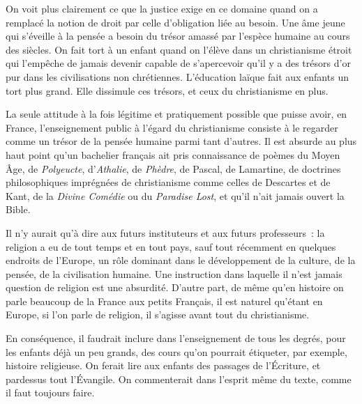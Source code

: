 \documentclass[french,twoside]{book} %
\begin{document}
On voit plus clairement ce que la justice exige en ce domaine quand on a remplacé la notion de droit par celle d'obligation liée au besoin. Une âme jeune qui s'éveille à la pensée a besoin du trésor amassé par l'espèce humaine au cours des siècles. On fait tort à un enfant quand on l'élève dans un christianisme étroit qui l'empêche de jamais devenir capable de s'apercevoir qu'il y a des trésors d'or pur dans les civilisations non chrétiennes. L'éducation laïque fait aux enfants un tort plus grand. Elle dissimule ces trésors, et ceux du christianisme en plus.\par
La seule attitude à la fois légitime et pratiquement possible que puisse avoir, en France, l'enseignement public à l'égard du christianisme consiste à le regarder comme un trésor de la pensée humaine parmi tant d'autres. Il est absurde au plus haut point qu'un bachelier français ait pris connaissance de poèmes du Moyen Âge, de {\itshape Polyeucte}, d'{\itshape Athalie}, de {\itshape Phèdre}, de Pascal, de Lamartine, de doctrines philosophiques imprégnées de christianisme comme celles de Descartes et de Kant, de la {\itshape Divine Comédie} ou du {\itshape Paradise Lost}, et qu'il n'ait jamais ouvert la Bible.\par
Il n'y aurait qu'à dire aux futurs instituteurs et aux futurs professeurs : la religion a eu de tout temps et en tout pays, sauf tout récemment en quelques endroits de l'Europe, un rôle dominant dans le développement de la culture, de la pensée, de la civilisation humaine. Une instruction dans laquelle il n'est jamais question de religion est une absurdité. D'autre part, de même qu'en histoire on parle beaucoup de la France aux petits Français, il est naturel qu'étant en Europe, si l'on parle de religion, il s'agisse avant tout du christianisme.\par
\par
En conséquence, il faudrait inclure dans l'enseignement de tous les degrés, pour les enfants déjà un peu grands, des cours qu'on pourrait étiqueter, par exemple, histoire religieuse. On ferait lire aux enfants des passages de l'Écriture, et pardessus tout l'Évangile. On commenterait dans l'esprit même du texte, comme il faut toujours faire.\par
\end{document}
